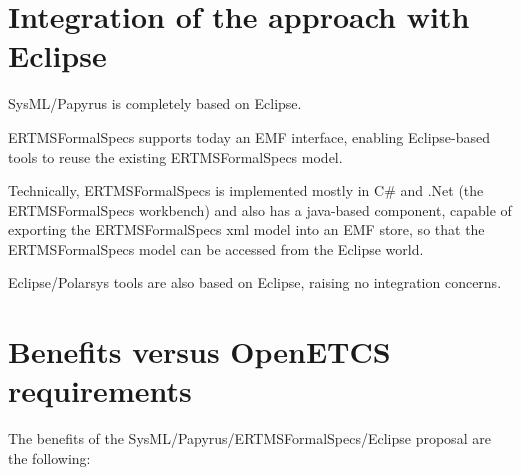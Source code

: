 \section{Integration of the approach with Eclipse}

SysML/Papyrus is completely based on Eclipse.

ERTMSFormalSpecs supports today an EMF interface, enabling Eclipse-based tools to reuse the existing ERTMSFormalSpecs model.

Technically, ERTMSFormalSpecs is implemented mostly in C\# and .Net (the ERTMSFormalSpecs workbench) and also has a java-based component, capable of exporting the ERTMSFormalSpecs xml model into an EMF store, so that the ERTMSFormalSpecs model can be accessed from the Eclipse world. 

Eclipse/Polarsys tools are also based on Eclipse, raising no integration concerns.

\section{Benefits versus OpenETCS requirements}

The benefits of the SysML/Papyrus/ERTMSFormalSpecs/Eclipse proposal are the following:

